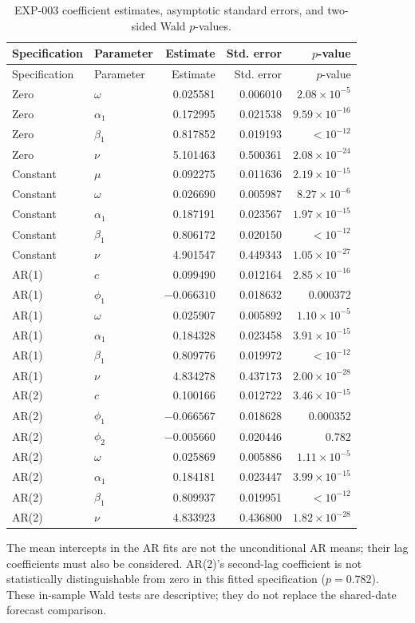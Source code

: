 \documentclass[11pt,a4paper]{article}
\begin{document}
\begin{longtable}{llrrr}
\caption{EXP-003 coefficient estimates, asymptotic standard errors, and two-sided Wald $p$-values.}\label{tab:full-inference}\\
\toprule Specification & Parameter & Estimate & Std. error & $p$-value\\
\midrule
\endfirsthead
\toprule Specification & Parameter & Estimate & Std. error & $p$-value\\
\midrule
\endhead
Zero & $\omega$ & 0.025581 & 0.006010 & $2.08\times10^{-5}$\\
Zero & $\alpha_1$ & 0.172995 & 0.021538 & $9.59\times10^{-16}$\\
Zero & $\beta_1$ & 0.817852 & 0.019193 & $<10^{-12}$\\
Zero & $\nu$ & 5.101463 & 0.500361 & $2.08\times10^{-24}$\\
Constant & $\mu$ & 0.092275 & 0.011636 & $2.19\times10^{-15}$\\
Constant & $\omega$ & 0.026690 & 0.005987 & $8.27\times10^{-6}$\\
Constant & $\alpha_1$ & 0.187191 & 0.023567 & $1.97\times10^{-15}$\\
Constant & $\beta_1$ & 0.806172 & 0.020150 & $<10^{-12}$\\
Constant & $\nu$ & 4.901547 & 0.449343 & $1.05\times10^{-27}$\\
AR(1) & $c$ & 0.099490 & 0.012164 & $2.85\times10^{-16}$\\
AR(1) & $\phi_1$ & $-0.066310$ & 0.018632 & 0.000372\\
AR(1) & $\omega$ & 0.025907 & 0.005892 & $1.10\times10^{-5}$\\
AR(1) & $\alpha_1$ & 0.184328 & 0.023458 & $3.91\times10^{-15}$\\
AR(1) & $\beta_1$ & 0.809776 & 0.019972 & $<10^{-12}$\\
AR(1) & $\nu$ & 4.834278 & 0.437173 & $2.00\times10^{-28}$\\
AR(2) & $c$ & 0.100166 & 0.012722 & $3.46\times10^{-15}$\\
AR(2) & $\phi_1$ & $-0.066567$ & 0.018628 & 0.000352\\
AR(2) & $\phi_2$ & $-0.005660$ & 0.020446 & 0.782\\
AR(2) & $\omega$ & 0.025869 & 0.005886 & $1.11\times10^{-5}$\\
AR(2) & $\alpha_1$ & 0.184181 & 0.023447 & $3.99\times10^{-15}$\\
AR(2) & $\beta_1$ & 0.809937 & 0.019951 & $<10^{-12}$\\
AR(2) & $\nu$ & 4.833923 & 0.436800 & $1.82\times10^{-28}$\\
\bottomrule
\end{longtable}
The mean intercepts in the AR fits are not the unconditional AR means; their lag coefficients
must also be considered. AR(2)'s second-lag coefficient is not statistically distinguishable
from zero in this fitted specification ($p=0.782$). These in-sample Wald tests are descriptive;
they do not replace the shared-date forecast comparison.
\end{document}
